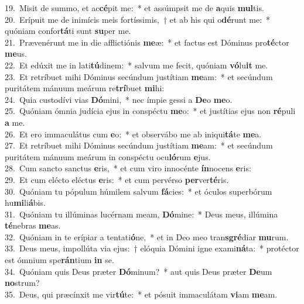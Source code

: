{19.~}Misit de summo, et ac\textbf{cé}pit me:~* et assúmpsit me de \textbf{a}quis \textbf{mul}tis.\\
{20.~}Erípuit me de inimícis meis fortíssimis,~† et ab his qui o\textbf{dé}runt me:~* quóniam confor\textbf{tá}ti sunt \textbf{su}per me.\\
{21.~}Prævenérunt me in die afflictiónis \textbf{me}æ:~* et factus est Dóminus pro\textbf{té}ctor \textbf{me}us.\\
{22.~}Et edúxit me in lati\textbf{tú}dinem:~* salvum me fecit, quóniam \textbf{vó}lu\textbf{it} me.\\
{23.~}Et retríbuet mihi Dóminus secúndum justítiam \textbf{me}am:~* et secúndum puritátem mánuum meárum re\textbf{trí}buet \textbf{mi}hi:\\
{24.~}Quia custodívi vias \textbf{Dó}mini,~* nec ímpie gessi a \textbf{De}o \textbf{me}o.\\
{25.~}Quóniam ómnia judícia ejus in conspéctu \textbf{me}o:~* et justítias ejus non \textbf{ré}puli \textbf{a} me.\\
{26.~}Et ero immaculátus cum \textbf{e}o:~* et observábo me ab iniqui\textbf{tá}te \textbf{me}a.\\
{27.~}Et retríbuet mihi Dóminus secúndum justítiam \textbf{me}am:~* et secúndum puritátem mánuum meárum in conspéctu ocu\textbf{ló}rum \textbf{e}jus.\\
{28.~}Cum sancto sanctus \textbf{e}ris,~* et cum viro innocénte \textbf{ín}nocens \textbf{e}ris:\\
{29.~}Et cum elécto eléctus \textbf{e}ris:~* et cum pervérso \textbf{per}ver\textbf{té}ris.\\
{30.~}Quóniam tu pópulum húmilem salvum \textbf{fá}cies:~* et óculos superbórum hu\textbf{mi}li\textbf{á}bis.\\
{31.~}Quóniam tu illúminas lucérnam meam, \textbf{Dó}mine:~* Deus meus, illúmina \textbf{té}nebras \textbf{me}as.\\
{32.~}Quóniam in te erípiar a tentati\textbf{ó}ne,~* et in Deo meo tran\textbf{sgré}diar \textbf{mu}rum.\\
{33.~}Deus meus, impollúta via ejus:~† elóquia Dómini igne exami\textbf{ná}ta:~* protéctor est ómnium spe\textbf{rán}tium \textbf{in} se.\\
{34.~}Quóniam quis Deus præter \textbf{Dó}minum?~* aut quis Deus præter \textbf{De}um \textbf{no}strum?\\
{35.~}Deus, qui præcínxit me vir\textbf{tú}te:~* et pósuit immaculátam \textbf{vi}am \textbf{me}am.\\
